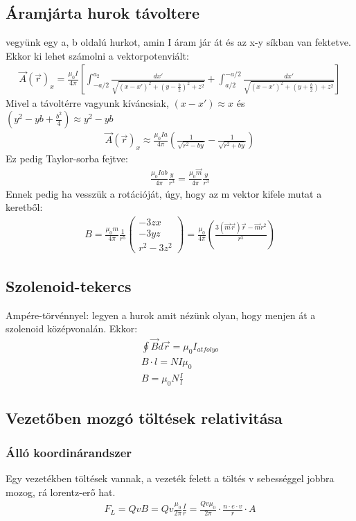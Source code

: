 \documentclass{article}
\begin{document}
\subsection{Áramjárta hurok távoltere}
vegyünk egy a, b oldalú hurkot, amin I áram jár át és az x-y síkban van fektetve. Ekkor ki lehet számolni a vektorpotenviált: 
\begin{gather*}
\vec{A}(\vec{r})_x = \frac{\mu_0I}{4\pi} \left[ \int_{-a/2}^{a_2} \frac{dx'}{\sqrt{(x-x')^2 + (y-\frac{b}{2})^2 + z^2}} + \int_{a/2}^{-a/2} \frac{dx'}{\sqrt{(x-x')^2 + (y+\frac{b}{2}) + z^2}} \right]
\end{gather*}
Mivel a távoltérre vagyunk kíváncsiak, $(x-x') \approx x$ és $(y^2-yb+\frac{b^2}{4}) \approx y^2-yb$
\begin{gather*}
\vec{A}(\vec{r})_x \approx \frac{\mu_0 I a}{4\pi} \left( \frac{1}{\sqrt{r^2-by}} - \frac{1}{\sqrt{r^2+by}}\right)
\end{gather*}
Ez pedig Taylor-sorba fejtve:
\begin{gather*}
\frac{\mu_0 I a b}{4\pi} \frac{y}{r^3} = \frac{\mu_0 \vec{m}}{4\pi} \frac{y}{r^3}
\end{gather*}
Ennek pedig ha vesszük a rotációját, úgy, hogy az m vektor kifele mutat a keretből:
\begin{gather*}
B=\frac{\mu_0 m}{4\pi} \frac{1}{r^5} \begin{pmatrix}
-3zx \\-3yz \\r^2-3z^2
\end{pmatrix} = \frac{\mu_0}{4\pi} \left( \frac{3(\vec{m}\vec{r})\vec{r}-\vec{m}r^2}{r^5} \right)
\end{gather*}
\subsection{Szolenoid-tekercs}
Ampére-törvénnyel: legyen a hurok amit nézünk olyan, hogy menjen át a szolenoid középvonalán. Ekkor:
\begin{gather*}
\oint \vec{B} d\vec{r} = \mu_0 I_{atfolyo} \\
B \cdot l = NI\mu_0 \\
B= \mu_0 N\frac{I}{l}
\end{gather*}
\subsection{Vezetőben mozgó töltések relativitása}
\subsubsection{Álló koordinárandszer}
Egy vezetékben töltések vannak, a vezeték felett a töltés v sebességgel jobbra mozog, rá lorentz-erő hat. 
\begin{gather*}
F_L = QvB=Qv\frac{\mu_0}{2\pi} \frac{I}{r} = \frac{Qv\mu_0}{2\pi} \cdot \frac{n\cdot e \cdot v}{r} \cdot A
\end{gather*}
\end{document}
